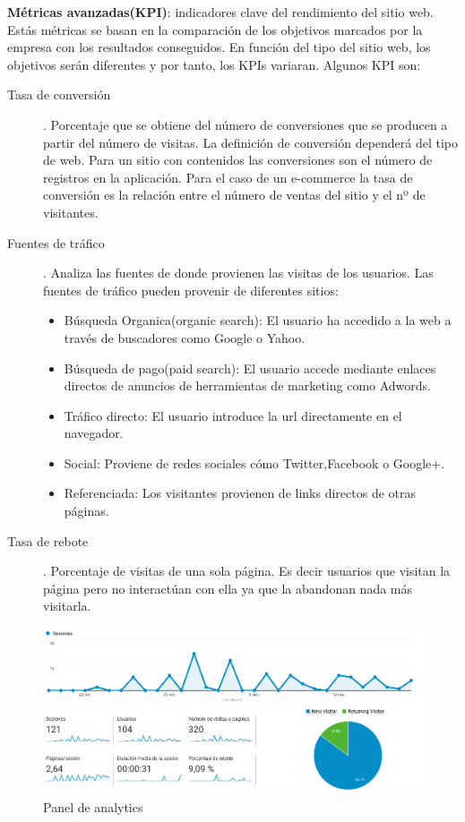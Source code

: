 \vspace{5 mm}

\textbf{Métricas avanzadas(KPI)}: indicadores clave del rendimiento del sitio web. Estás métricas se basan en la comparación de los objetivos marcados por la empresa con los resultados conseguidos. En función del tipo del sitio web, los objetivos serán diferentes y por tanto, los KPIs variaran. Algunos KPI son:

\begin{description}


\item [Tasa de conversión]. Porcentaje que se obtiene del número de conversiones que se producen a partir del número de visitas. La definición de conversión dependerá del tipo de web. Para un sitio con contenidos las conversiones son el número de registros en la aplicación. Para el caso de un e-commerce la tasa de conversión es la relación entre el número de ventas del sitio y el nº de visitantes.

\item [Fuentes de tráfico]. Analiza las fuentes de donde provienen las visitas de los usuarios. Las fuentes de tráfico pueden provenir de diferentes sitios:

\begin{itemize}
\item Búsqueda Organica(organic search): El usuario ha accedido a la web a través de buscadores como Google o Yahoo.
\item Búsqueda de pago(paid search): El usuario accede mediante enlaces directos de anuncios de herramientas de marketing como Adwords.
\item Tráfico directo: El usuario introduce la url directamente en el navegador.
\item Social: Proviene de redes sociales cómo Twitter,Facebook o Google+.
\item Referenciada: Los visitantes provienen de links directos de otras páginas.
\end{itemize}

\item [Tasa de rebote]. Porcentaje de visitas de una sola página. Es decir usuarios que visitan la página pero no interactúan con ella ya que la abandonan nada más visitarla.
\end{description}

\begin{figure}
\begin{center}
\includegraphics[width=1.0\textwidth]{imagenes/analytics.png}
\caption{Panel de analytics}
\label{analytics}
\end{center}
\end{figure}

